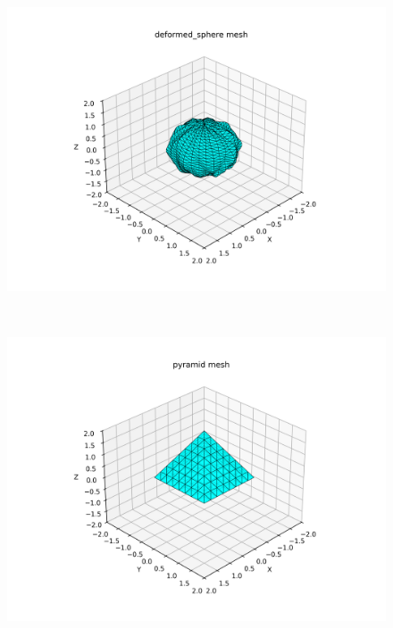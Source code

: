 \documentclass[11pt]{article}
\begin{document}
\begin{figure}[H]
\begin{minipage}{0.3\textwidth}
    \end{minipage}%
    \hfill
    \begin{minipage}{0.3\textwidth}
        \centering
        \includegraphics[width=1.1\linewidth]{../figs/deformed_sphere.png}

    \end{minipage} \\
    \vspace{0.5cm} %

    \begin{minipage}{0.3\textwidth}
        \centering
        \includegraphics[width=1.1\linewidth]{../figs/pyramid.png}


\end{minipage}
\end{figure}
\end{document}
